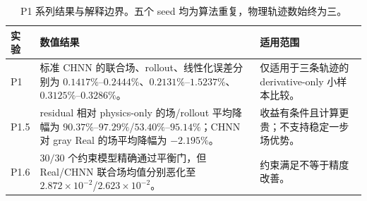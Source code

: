 \begin{table}[htbp]
\centering
\caption{P1 系列结果与解释边界。五个 seed 均为算法重复，物理轨迹数始终为三。}
\label{tab:p1-series-summary}
\small
\begin{tabularx}{\textwidth}{@{}l>{\raggedright\arraybackslash}X>{\raggedright\arraybackslash}X@{}}
\toprule
实验 & 数值结果 & 适用范围 \\
\midrule
P1 &
标准 CHNN 的联合场、rollout、线性化误差分别为 \(0.1417\%\)--\(0.2444\%\)、\(0.2131\%\)--\(1.5237\%\)、\(0.3125\%\)--\(0.3286\%\)。 &
仅适用于三条轨迹的 derivative-only 小样本比较。 \\
P1.5 &
residual 相对 physics-only 的场/rollout 平均降幅为 \(90.37\%\)--\(97.29\%\)/\(53.40\%\)--\(95.14\%\)；CHNN 对 gray Real 的场平均降幅为 \(-2.195\%\)。 &
收益有条件且计算更贵；不支持稳定一步场优势。 \\
P1.6 &
\(30/30\) 个约束模型精确通过平衡门，但 Real/CHNN 联合场均值分别恶化至 \(2.872\times10^{-2}\)/\(2.623\times10^{-2}\)。 &
约束满足不等于精度改善。 \\
\bottomrule
\end{tabularx}
\end{table}
